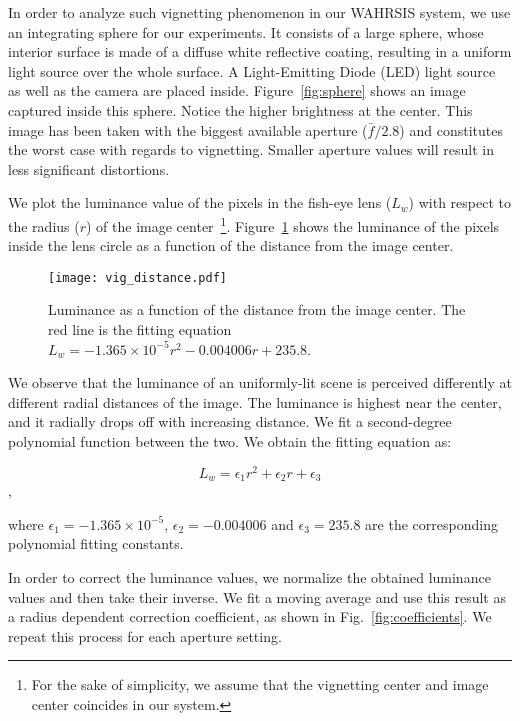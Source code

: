 In order to analyze such vignetting phenomenon in our WAHRSIS system, we use an integrating sphere for our experiments. It consists of a large sphere, whose interior surface is made of a diffuse white reflective coating, resulting in a uniform light source over the whole surface. A Light-Emitting Diode (LED) light source as well as the camera are placed inside. Figure~\ref{fig:sphere} shows an image captured inside this sphere. Notice the higher brightness at the center. This image has been taken with the biggest available aperture ($\bar{f}/2.8$) and constitutes the worst case with regards to vignetting. Smaller aperture values will result in less significant distortions.

We plot the luminance value of the pixels in the fish-eye lens ($L_w$) with respect to the radius ($r$) of the image center~\footnote{For the sake of simplicity, we assume that the vignetting center and image center coincides in our system.}. Figure~\ref{fig:pro_distance} shows the luminance of the pixels inside the lens circle as a function of the distance from the image center. 

\begin{figure}[htb]
\centering
\texttt{[image: vig\_distance.pdf]}
\caption[Luminance as a function of the distance from the image center.]{Luminance as a function of the distance from the image center. The red line is the fitting equation $ L_w = -1.365 \times 10^{-5} r^2 - 0.004006 r + 235.8 $.}
\label{fig:pro_distance}
\end{figure}

We observe that the luminance of an uniformly-lit scene is perceived differently at different radial distances of the image. The luminance is highest near the center, and it radially drops off with increasing distance. We fit a second-degree polynomial function between the two. We obtain the fitting equation as:

\[L_w = \epsilon_1 r^2 + \epsilon_2 r + \epsilon_3 \],

where $\epsilon_1 = -1.365 \times 10^{-5}$, $\epsilon_2 = -0.004006$ and $\epsilon_3 = 235.8$ are the corresponding polynomial fitting constants. 

In order to correct the luminance values, we normalize the obtained luminance values and then take their inverse. We fit a moving average and use this result as a radius dependent correction coefficient, as shown in Fig.~\ref{fig:coefficients}. We repeat this process for each aperture setting.

